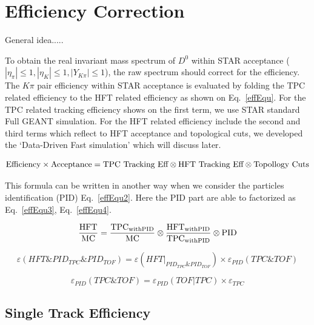 \clearpage

\section{Efficiency Correction}
General idea.....

To obtain the real invariant mass spectrum of $D^0$ within STAR acceptance ($|\eta_{\pi}| \leq 1, |\eta_{K}| \leq 1, |Y_{K\pi}| \leq 1$), the raw spectrum should correct for the efficiency. The $K\pi$ pair efficiency within STAR acceptance is evaluated by folding the TPC related efficiency to the HFT related efficiency as shown on Eq.~\ref{effEqu}. For the TPC related tracking efficiency shows on the first term, we use STAR standard Full GEANT simulation. For the HFT related efficiency include the second and third terms which reflect to HFT acceptance and topological cuts, we developed the `Data-Driven Fast simulation' which will discuss later.

\begin{equation}
  \textup{Efficiency} \times \textup{Acceptance}  = \textup{TPC Tracking Eff} \otimes \textup{HFT Tracking Eff} \otimes \textup{Topollogy Cuts}
\label{effEqu}
\end{equation}

This formula can be written in another way when we consider the particles identification (PID) Eq.~\ref{effEqu2}. Here the PID part are able to factorized as Eq.~\ref{effEqu3}, Eq.~\ref{effEqu4}.

\begin{equation}
  \frac{\textup{HFT}}{\textup{MC}} =  \frac{\textup{TPC}_\textup{{withPID}}}{\textup{MC}} \otimes \frac{\textup{HFT}_\textup{{withPID}}}{\textup{TPC}_\textup{{withPID}}} \otimes \textup{PID}
\label{effEqu2}
\end{equation}

\begin{equation}
  \varepsilon(HFT \& PID_{TPC} \& PID_{TOF}) = \varepsilon(HFT | _{PID_{TPC} \& PID_{TOF}}) \times \varepsilon_{PID}(TPC\&TOF)
\label{effEqu3}
\end{equation}

\begin{equation}
  \varepsilon_{PID}(TPC\&TOF) = \varepsilon_{PID}(TOF | TPC) \times \varepsilon_{TPC}
\label{effEqu4}
\end{equation}

\subsection{Single Track Efficiency}

